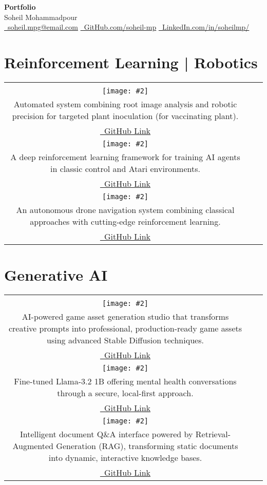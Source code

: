 \documentclass[b3paper]{article}
\makeatletter
\newcommand{\projectrow}[3]{%
    \begin{center}
    \begin{tabular}{@{}c@{\hspace{0.5cm}}c@{\hspace{0.5cm}}c@{}}
    #1 & #2 & #3
    \end{tabular}
    \end{center}
}
\newcommand{\rlprojectbox}[4]{%
    \begin{tcolorbox}[
        colback=boxcolor,
        width=0.32\textwidth,
        height=9.7cm,  %
        arc=5pt,
        box align=top,
        nobeforeafter,
        sharp corners=northwest
    ]
        \centering
        \fontsize{18pt}{20pt}\selectfont\textbf{#1}\\[0.5cm]
        \texttt{[image: \#2]}\\[0.3cm]
        \fontsize{14pt}{16pt}\selectfont #3\par
        \\[0.3cm]
        \href{#4}{\faGithub\ GitHub Link}
    \end{tcolorbox}%
}
\newcommand{\genaiprojectbox}[4]{%
    \begin{tcolorbox}[
        colback=boxcolor,
        width=0.32\textwidth,
        height=11.7cm,  %
        arc=5pt,
        box align=top,
        nobeforeafter,
        sharp corners=northwest
    ]
        \centering
        \fontsize{18pt}{20pt}\selectfont\textbf{#1}\\[0.5cm]
        \texttt{[image: \#2]}\\[0.3cm]
        \fontsize{14pt}{16pt}\selectfont #3\par
        \\[0.3cm]
        \href{#4}{\faGithub\ GitHub Link}
    \end{tcolorbox}%
}
\makeatother
\begin{document}
\begin{center}
    \textcolor{headercolor}{\Huge\textbf{Portfolio}}\\[0.5cm]
    \textcolor{headercolor}{\Large Soheil Mohammadpour}\\[0.3cm]
    \href{mailto:john.doe@email.com}{\faEnvelope\ soheil.mpg@email.com} \quad
    \href{https://github.com/soheil-mp}{\faGithub\ GitHub.com/soheil-mp} \quad
    \href{https://www.linkedin.com/in/soheilmp/}{\faLinkedin\ LinkedIn.com/in/soheilmp/}\\[1cm]
\end{center}

\section*{\LARGE{Reinforcement Learning | Robotics}}

\projectrow
{\rlprojectbox{Automated Plant Inoculation}{assets/plant_inoculation_1.png}
{Automated system combining root image analysis and robotic precision for targeted plant inoculation (for vaccinating plant).}
{https://github.com/soheil-mp/Plant-Inoculation-AI}}
{\rlprojectbox{Auto Pilot Gaming}{assets/autopilot_gaming.png}
{A deep reinforcement learning framework for training AI agents in classic control and Atari environments.}
{https://github.com/soheil-mp/Auto-Pilot-Gaming}}
{\rlprojectbox{Sky Pilot}{assets/skypilot_1.png}
{An autonomous drone navigation system combining classical approaches with cutting-edge reinforcement learning.}
{https://github.com/soheil-mp/SkyPilot}}

\section*{\LARGE{Generative AI}}

\projectrow
{\genaiprojectbox{Game Asset Lab}{assets/game_asset_lab.png}
{AI-powered game asset generation studio that transforms creative prompts into professional, production-ready game assets using advanced Stable Diffusion techniques.}
{https://github.com/soheil-mp/GameAssetLab}}
{\genaiprojectbox{AI Therapist Assistant}{assets/ai_therapist.png}
{Fine-tuned Llama-3.2 1B offering mental health conversations through a secure, local-first approach.}
{https://github.com/soheil-mp/AI-Therapist-Assistant}}
{\genaiprojectbox{Doc Chat}{assets/doc_chat.png}
{Intelligent document Q\&A interface powered by Retrieval-Augmented Generation (RAG), transforming static documents into dynamic, interactive knowledge bases.}
{https://github.com/soheil-mp/DocChat}}
\end{document}
